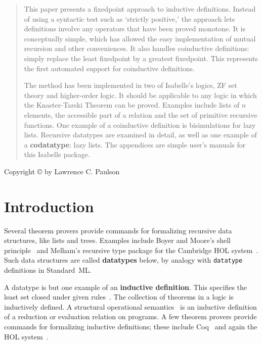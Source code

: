 \binperiod     %


\pagestyle{empty}
\begin{titlepage}
\maketitle 
\begin{abstract}
  This paper presents a fixedpoint approach to inductive definitions.
  Instead of using a syntactic test such as `strictly positive,' the
  approach lets definitions involve any operators that have been proved
  monotone.  It is conceptually simple, which has allowed the easy
  implementation of mutual recursion and other conveniences.  It also
  handles coinductive definitions: simply replace the least fixedpoint by a
  greatest fixedpoint.  This represents the first automated support for
  coinductive definitions.

  The method has been implemented in two of Isabelle's logics, ZF set theory
  and higher-order logic.  It should be applicable to any logic in which
  the Knaster-Tarski Theorem can be proved.  Examples include lists of $n$
  elements, the accessible part of a relation and the set of primitive
  recursive functions.  One example of a coinductive definition is
  bisimulations for lazy lists.  \ifCADE\else Recursive datatypes are
  examined in detail, as well as one example of a {\bf codatatype}: lazy
  lists.  The appendices are simple user's manuals for this Isabelle
  package.\fi
\end{abstract}
%
\bigskip\centerline{Copyright \copyright{} \number\year{} by Lawrence C. Paulson}
\thispagestyle{empty} 
\end{titlepage}
\tableofcontents\cleardoublepage\pagestyle{plain}

\section{Introduction}
Several theorem provers provide commands for formalizing recursive data
structures, like lists and trees.  Examples include Boyer and Moore's shell
principle~\cite{bm79} and Melham's recursive type package for the Cambridge HOL
system~\cite{melham89}.  Such data structures are called {\bf datatypes}
below, by analogy with {\tt datatype} definitions in Standard~ML\@.

A datatype is but one example of an {\bf inductive definition}.  This
specifies the least set closed under given rules~\cite{aczel77}.  The
collection of theorems in a logic is inductively defined.  A structural
operational semantics~\cite{hennessy90} is an inductive definition of a
reduction or evaluation relation on programs.  A few theorem provers
provide commands for formalizing inductive definitions; these include
Coq~\cite{paulin92} and again the HOL system~\cite{camilleri92}.

